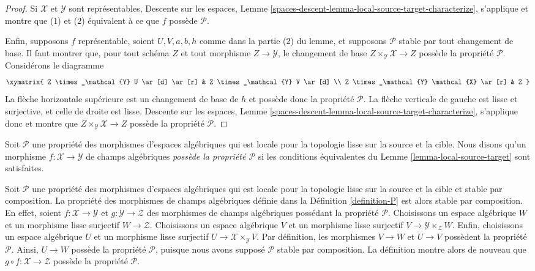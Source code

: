 \begin{proof}
\medskip\noindent
Si $\mathcal{X}$ et $\mathcal{Y}$ sont représentables, Descente sur les
espaces, Lemme \ref{spaces-descent-lemma-local-source-target-characterize},
s'applique et montre que (1) et (2) équivalent à ce que $f$ possède
$\mathcal{P}$.

\medskip\noindent
Enfin, supposons $f$ représentable, soient $U, V, a, b, h$ comme dans
la partie (2) du lemme, et supposons $\mathcal{P}$ stable par tout
changement de base. Il faut montrer que, pour tout schéma $Z$ et tout
morphisme $Z \to \mathcal{Y}$, le changement de base
$Z \times_\mathcal{Y} \mathcal{X} \to Z$
possède la propriété $\mathcal{P}$. Considérons le diagramme
$$
\xymatrix{
Z \times_\mathcal{Y} U \ar[d] \ar[r] &
Z \times_\mathcal{Y} V \ar[d] \\
Z \times_\mathcal{Y} \mathcal{X} \ar[r] &
Z
}
$$
La flèche horizontale supérieure est un changement de base de $h$ et
possède donc la propriété $\mathcal{P}$. La flèche verticale de gauche
est lisse et surjective, et celle de droite est lisse. Descente sur les
espaces, Lemme \ref{spaces-descent-lemma-local-source-target-characterize},
s'applique donc et montre que
$Z \times_\mathcal{Y} \mathcal{X} \to Z$ possède la propriété
$\mathcal{P}$.
\end{proof}

\begin{definition}
\label{definition-P}
Soit $\mathcal{P}$ une propriété des morphismes d'espaces algébriques
qui est locale pour la topologie lisse sur la source et la cible.
Nous disons qu'un morphisme $f : \mathcal{X} \to \mathcal{Y}$ de champs
algébriques {\it possède la propriété $\mathcal{P}$} si les conditions
équivalentes du Lemme \ref{lemma-local-source-target} sont satisfaites.
\end{definition}

\begin{remark}
\label{remark-composition}
Soit $\mathcal{P}$ une propriété des morphismes d'espaces algébriques
qui est locale pour la topologie lisse sur la source et la cible et
stable par composition. La propriété des morphismes de champs algébriques
définie dans la Définition \ref{definition-P} est alors stable par
composition. En effet, soient $f : \mathcal{X} \to \mathcal{Y}$ et
$g : \mathcal{Y} \to \mathcal{Z}$ des morphismes de champs algébriques
possédant la propriété $\mathcal{P}$. Choisissons un espace algébrique
$W$ et un morphisme lisse surjectif $W \to \mathcal{Z}$. Choisissons
un espace algébrique $V$ et un morphisme lisse surjectif
$V \to \mathcal{Y} \times_\mathcal{Z} W$. Enfin, choisissons un espace
algébrique $U$ et un morphisme lisse surjectif
$U \to \mathcal{X} \times_\mathcal{Y} V$. Par définition, les morphismes
$V \to W$ et $U \to V$ possèdent la propriété $\mathcal{P}$.
Ainsi, $U \to W$ possède la propriété $\mathcal{P}$, puisque nous avons
supposé $\mathcal{P}$ stable par composition. La définition montre alors
de nouveau que
$g \circ f : \mathcal{X} \to \mathcal{Z}$ possède la propriété
$\mathcal{P}$.
\end{remark}

